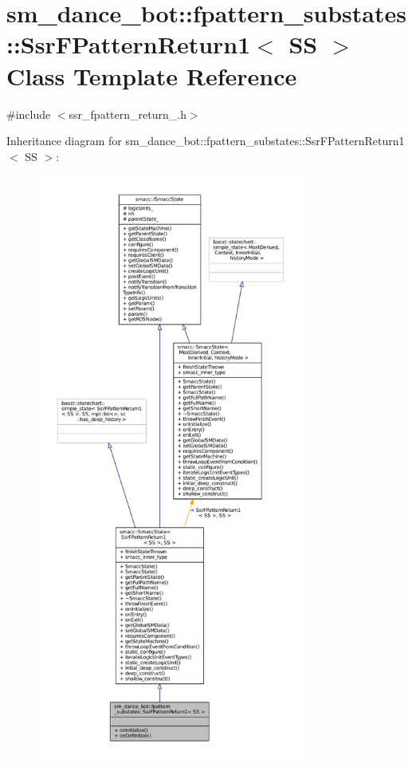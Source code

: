 \hypertarget{structsm__dance__bot_1_1fpattern__substates_1_1SsrFPatternReturn1}{}\section{sm\+\_\+dance\+\_\+bot\+:\+:fpattern\+\_\+substates\+:\+:Ssr\+F\+Pattern\+Return1$<$ SS $>$ Class Template Reference}
\label{structsm__dance__bot_1_1fpattern__substates_1_1SsrFPatternReturn1}


{\ttfamily \#include $<$ssr\+\_\+fpattern\+\_\+return\+\_.\+h$>$}



Inheritance diagram for sm\+\_\+dance\+\_\+bot\+:\+:fpattern\+\_\+substates\+:\+:Ssr\+F\+Pattern\+Return1$<$ SS $>$\+:
\nopagebreak
\begin{figure}[H]
\begin{center}
\leavevmode
\includegraphics[height=550pt]{structsm__dance__bot_1_1fpattern__substates_1_1SsrFPatternReturn1__inherit__graph}
\end{center}
\end{figure}


